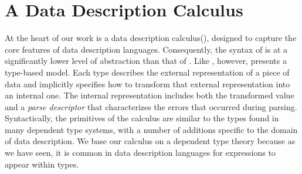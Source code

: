 \section{A Data Description Calculus}
\label{sec:ddc}

At the heart of our work is a data description calculus(\ddc{}),
designed to capture the core features of data description languages.
Consequently, the syntax of \ddc{} is at a significantly lower level
of abstraction than that of \ipads{}.  Like \ipads{}, however, \ddc{}
presents a type-based model.  Each \ddc{} type describes the external
representation of a piece of data and implicitly specifies how to
transform that external representation into an internal one.  The
internal representation includes both the transformed value and a
\textit{parse descriptor} that characterizes the errors that occurred
during parsing. Syntactically, the primitives of the calculus are
similar to the types found in many dependent type systems, with a
number of additions specific to the domain of data description.
We base our calculus on a dependent type theory because as we have seen,
it is common in data description languages for expressions to appear within
types.


